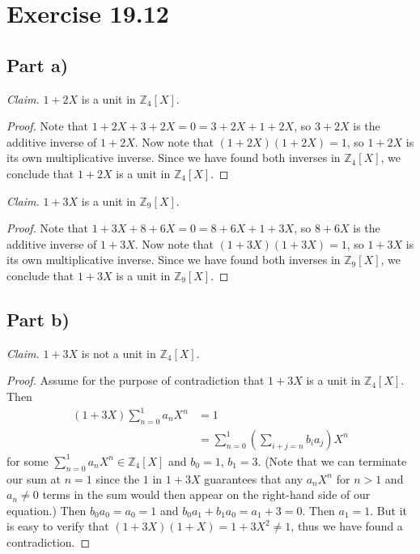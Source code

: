 \documentclass{abrice}
\newcommand{\Z}{\mathbb{Z}}
\begin{document}
\section{Exercise 19.12}

\subsection{Part a)}

\emph{Claim.} $1 + 2X$ is a unit in $\Z_4[X]$.

\begin{proof}
  Note that $1 + 2X + 3 + 2X = 0 = 3 + 2X + 1 + 2X$, so $3 + 2X$ is the additive
  inverse of $1 + 2X$. Now note that $(1 + 2X)(1 + 2X) = 1$, so $1 + 2X$ is its
  own multiplicative inverse. Since we have found both inverses in $\Z_4[X]$, we conclude
  that $1 + 2X$ is a unit in $\Z_4[X]$.
\end{proof}

\noindent
\emph{Claim.} $1 + 3X$ is a unit in $\Z_9[X]$.

\begin{proof}
  Note that $1 + 3X + 8 + 6X = 0 = 8 + 6X + 1 + 3X$, so $8 + 6X$ is the additive
  inverse of $1 + 3X$. Now note that $(1 + 3X)(1 + 3X) = 1$, so $1 + 3X$ is its
  own multiplicative inverse. Since we have found both inverses in $\Z_9[X]$, we
  conclude that $1 + 3X$ is a unit in $\Z_9[X]$.
\end{proof}

\subsection{Part b)}

\emph{Claim.} $1 + 3X$ is not a unit in $\Z_4[X]$.

\begin{proof}
  Assume for the purpose of contradiction that $1 + 3X$ is a unit in $\Z_4[X]$.
  Then
  \begin{align*}
    (1 + 3X) \sum_{n=0}^{1} a_n X^n
    &= 1 \\
    &= \sum_{n=0}^{1} \left( \sum_{i+j=n} b_i a_j \right) X^n
  \end{align*}
  for some $\sum_{n=0}^{1} a_n X^n \in \Z_4[X]$ and $b_0 = 1$, $b_1 = 3$. (Note
  that we can terminate our sum at $n = 1$ since the $1$ in $1 + 3X$ guarantees
  that any $a_n X^n$ for $n > 1$ and $a_n \neq 0$ terms in the sum would then
  appear on the right-hand side of our equation.) Then $b_0 a_0 = a_0 = 1$ and
  $b_0 a_1 + b_1 a_0 = a_1 + 3 = 0$. Then $a_1 = 1$. But it is easy to verify
  that $(1 + 3X)(1 + X) = 1 + 3X^2 \neq 1$, thus we have found a contradiction.
\end{proof}
\end{document}

